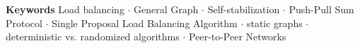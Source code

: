 \textbf{Keywords} Load balancing $\cdot$ General Graph $\cdot$ Self-stabilization $\cdot$ Push-Pull Sum Protocol $\cdot$ Single Proposal Load Balancing Algorithm $\cdot$ static graphs $\cdot$ deterministic vs. randomized algorithms $\cdot$ Peer-to-Peer Networks

\renewcommand{\clearpage}{}